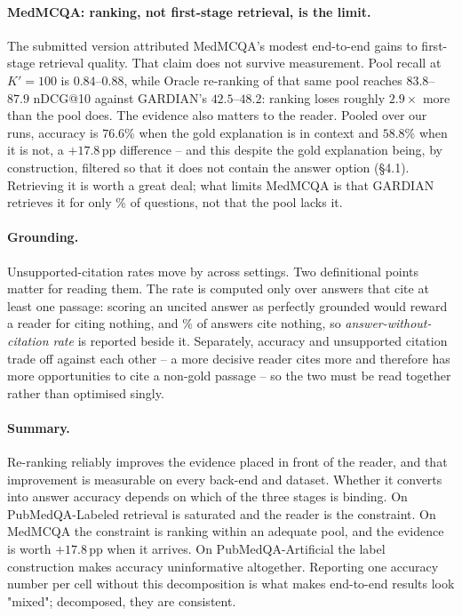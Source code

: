 \paragraph{MedMCQA: ranking, not first-stage retrieval, is the limit.}
The submitted version attributed MedMCQA's modest end-to-end gains to
first-stage retrieval quality. That claim does not survive measurement.
Pool recall at $K'{=}100$ is $0.84$--$0.88$, while Oracle re-ranking of
that same pool reaches $83.8$--$87.9$ nDCG@10 against GARDIAN's
$42.5$--$48.2$: ranking loses roughly $2.9\times$ more than the pool
does. The evidence also matters to the reader. Pooled over our runs,
accuracy is $76.6$\% when the gold explanation is in context and
$58.8$\% when it is not, a $+17.8$\,pp difference -- and this despite the
gold explanation being, by construction, filtered so that it does not
contain the answer option (§4.1). Retrieving it is worth a great deal;
what limits MedMCQA is that GARDIAN retrieves it for only \PENDING\% of
questions, not that the pool lacks it.

\paragraph{Grounding.}
Unsupported-citation rates move by \PENDING across settings. Two
definitional points matter for reading them. The rate is computed only
over answers that cite at least one passage: scoring an uncited answer as
perfectly grounded would reward a reader for citing nothing, and
\PENDING\% of answers cite nothing, so \emph{answer-without-citation
rate} is reported beside it. Separately, accuracy and unsupported
citation trade off against each other -- a more decisive reader cites
more and therefore has more opportunities to cite a non-gold passage --
so the two must be read together rather than optimised singly.

\paragraph{Summary.}
Re-ranking reliably improves the evidence placed in front of the reader,
and that improvement is measurable on every back-end and dataset.
Whether it converts into answer accuracy depends on which of the three
stages is binding. On PubMedQA-Labeled retrieval is saturated and the
reader is the constraint. On MedMCQA the constraint is ranking within an
adequate pool, and the evidence is worth $+17.8$\,pp when it arrives. On
PubMedQA-Artificial the label construction makes accuracy uninformative
altogether. Reporting one accuracy number per cell without this
decomposition is what makes end-to-end results look "mixed"; decomposed,
they are consistent.
